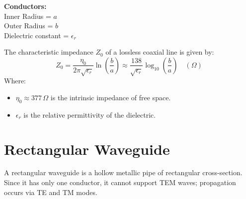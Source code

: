 \documentclass[12pt,a4paper]{article}
\begin{document}
\begin{tcolorbox}[tikzbox, title={Coaxial Line Structure}]
\begin{minipage}[c]{0.45\linewidth}
\centering
{}
\end{minipage}\hfill
\begin{minipage}[c]{0.5\linewidth}
\raggedright
\textbf{Conductors:}\\[3pt]
Inner Radius = $a$\\
Outer Radius = $b$\\
Dielectric constant = $\epsilon_r$
\end{minipage}
\end{tcolorbox}

\begin{tcolorbox}[formulabox, title={\textbf{Coaxial Line Characteristic Impedance}}]
The characteristic impedance $Z_0$ of a lossless coaxial line is given by:
\begin{equation}
  Z_0 = \frac{\eta_0}{2\pi \sqrt{\epsilon_r}} \ln\left(\frac{b}{a}\right) \approx \frac{138}{\sqrt{\epsilon_r}} \log_{10}\left(\frac{b}{a}\right) \quad (\Omega)
\end{equation}
Where:
\begin{itemize}[leftmargin=1.5em, itemsep=1pt, topsep=2pt]
  \item[] $\eta_0 \approx 377\,\Omega$ is the intrinsic impedance of free space.
  \item[] $\epsilon_r$ is the relative permittivity of the dielectric.
\end{itemize}
\end{tcolorbox}

\section{Rectangular Waveguide}

A rectangular waveguide is a hollow metallic pipe of rectangular cross-section. Since it has only one conductor, it cannot support TEM waves; propagation occurs via TE and TM modes.
\end{document}
